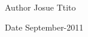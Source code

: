 \begin{DoxyAuthor}{Author}
Josue Ttito 
\end{DoxyAuthor}
\begin{DoxyDate}{Date}
September-\/2011 
\end{DoxyDate}
